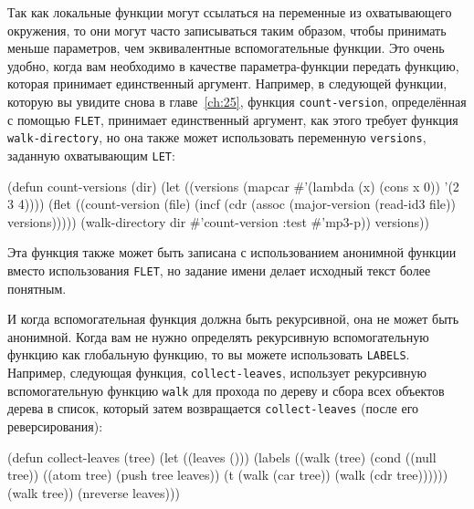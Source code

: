 Так как локальные функции могут ссылаться на переменные из охватывающего окружения, то
они могут часто записываться таким образом, чтобы принимать меньше параметров, чем
эквивалентные вспомогательные функции.  Это очень удобно, когда вам необходимо в качестве
параметра-функции передать функцию, которая принимает единственный аргумент. Например, в
следующей функции, которую вы увидите снова в главе~\ref{ch:25}, функция
\lstinline{count-version}, определённая с помощью \lstinline{FLET}, принимает единственный аргумент,
как этого требует функция \lstinline{walk-directory}, но она также может использовать
переменную \lstinline{versions}, заданную охватывающим \lstinline{LET}:

\begin{myverb}
(defun count-versions (dir)
  (let ((versions (mapcar #'(lambda (x) (cons x 0)) '(2 3 4))))
    (flet ((count-version (file)
             (incf (cdr (assoc (major-version (read-id3 file)) versions)))))
      (walk-directory dir #'count-version :test #'mp3-p))
    versions))
\end{myverb}

Эта функция также может быть записана с использованием анонимной функции вместо
использования \lstinline{FLET}, но задание имени делает исходный текст более понятным.

И когда вспомогательная функция должна быть рекурсивной, она не может быть
анонимной.  Когда вам не нужно определять рекурсивную
вспомогательную функцию как глобальную функцию, то вы можете использовать \lstinline{LABELS}.
Например, следующая функция, \lstinline{collect-leaves}, использует рекурсивную вспомогательную
функцию \lstinline{walk} для прохода по дереву и сбора всех объектов дерева в список, который
затем возвращается \lstinline{collect-leaves} (после его реверсирования):

\begin{myverb}
(defun collect-leaves (tree)
  (let ((leaves ()))
    (labels ((walk (tree)
               (cond
                 ((null tree))
                 ((atom tree) (push tree leaves))
                 (t (walk (car tree))
                    (walk (cdr tree))))))
      (walk tree))
    (nreverse leaves)))
\end{myverb}


